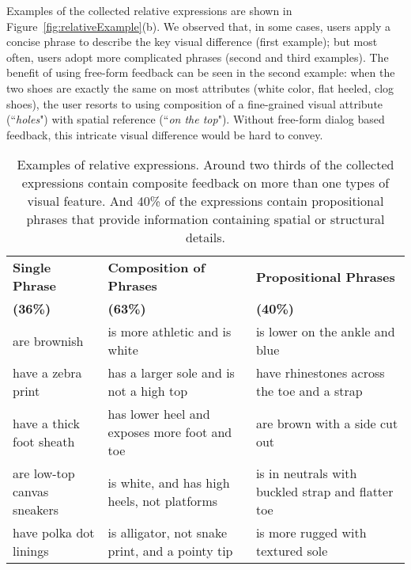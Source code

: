 Examples of the collected relative expressions are shown in 
Figure~\ref{fig:relativeExample}(b). We observed that, in some cases, 
users apply a concise phrase to describe the key visual difference (first example); 
but most often, users adopt more complicated phrases (second and third examples). 
The benefit of using free-form feedback can be seen
in the second example: when the two shoes are exactly the same on most attributes 
(white color, flat heeled, clog shoes), the user resorts to using composition of 
a fine-grained visual attribute (``\emph{holes}") with spatial reference (``\emph{on the top}"). Without free-form dialog based feedback, this intricate visual 
difference would be hard to convey. 



\begin{table*}
\begin{center}
\small
  \begin{tabular}{p{4cm} | p{4cm} | p{4.4cm}}
    \hline
    {\bf Single Phrase } & \bf{Composition of Phrases } & \bf{Propositional Phrases} \\ 
    {\bf (36\%)} & \bf{(63\%)} & \bf{(40\%)} \\\hline\hline
    
 are brownish & is \textcolor{NavyBlue}{more athletic} and is \textcolor{NavyBlue}{white} & is lower \textcolor{NavyBlue}{on the ankle} and blue \\ \hline
    have a zebra print & has \textcolor{NavyBlue}{a larger sole} and is \textcolor{NavyBlue}{not a high top} & have rhinestones \textcolor{NavyBlue}{across the toe} and a strap \\\hline
    have a thick foot sheath & has \textcolor{NavyBlue}{lower heel} and \textcolor{NavyBlue}{exposes more foot and toe} & are brown \textcolor{NavyBlue}{with a side cut out} \\\hline
    are low-top canvas sneakers& is \textcolor{NavyBlue}{white}, and \textcolor{NavyBlue}{has high heels, not platforms} & is in neutrals \textcolor{NavyBlue}{with buckled strap} and flatter toe \\\hline
    have polka dot linings & is \textcolor{NavyBlue}{alligator}, \textcolor{NavyBlue}{not snake print}, and \textcolor{NavyBlue}{a pointy tip} & is more rugged \textcolor{NavyBlue}{with textured sole} \\%
    \hline
  \end{tabular}
\end{center}
 \caption{Examples of relative expressions. Around two thirds of the collected expressions 
contain composite feedback on more than one types of visual feature. And 40\%
of the expressions contain propositional phrases that provide information 
containing spatial or structural details.}
\label{tab:phrases}
\end{table*}

